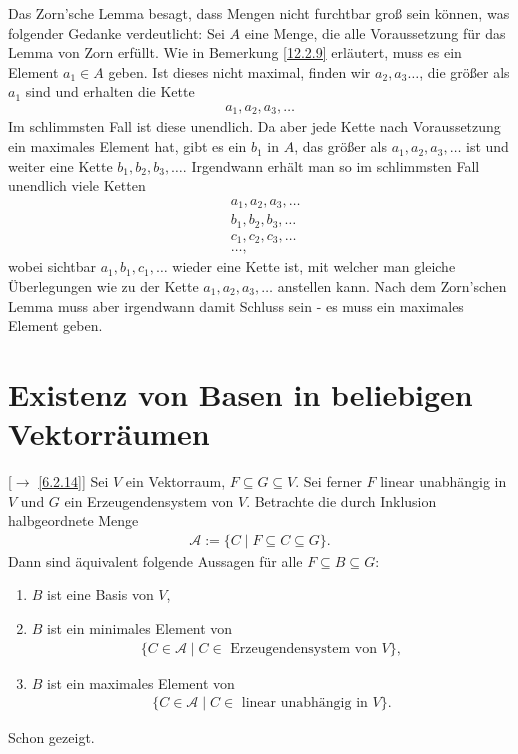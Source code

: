 \documentclass[../../main.tex]{subfiles}
\begin{document}
\begin{ans}
Das Zorn'sche Lemma besagt, dass Mengen nicht furchtbar groß sein können, was folgender Gedanke verdeutlicht: Sei $A$ eine Menge, die alle Voraussetzung für das Lemma von Zorn erfüllt. Wie in Bemerkung \ref{12.2.9} erläutert, muss es ein Element $a_1\in A$ geben. Ist dieses nicht maximal, finden wir $a_2,a_3\ldots $, die größer als $a_1$ sind und erhalten die Kette
\begin{align*}
a_1,a_2,a_3,\ldots 
\end{align*}
Im schlimmsten Fall ist diese unendlich. Da aber jede Kette nach Voraussetzung ein maximales Element hat, gibt es ein $b_1$ in $A$, das größer als $a_1,a_2,a_3,\ldots $ ist und weiter eine Kette $b_1,b_2,b_3,\ldots $. Irgendwann erhält man so im schlimmsten Fall unendlich viele Ketten
\begin{align*}
&a_1,a_2,a_3,\ldots \\
&b_1,b_2,b_3,\ldots \\
&c_1,c_2,c_3,\ldots \\
&\ldots ,
\end{align*}
wobei sichtbar $a_1,b_1,c_1,\ldots $ wieder eine Kette ist, mit welcher man gleiche Überlegungen wie zu der Kette $a_1,a_2,a_3,\ldots $ anstellen kann. Nach dem Zorn'schen Lemma muss aber irgendwann damit Schluss sein - es muss ein maximales Element geben.
\end{ans}

\section{Existenz von Basen in beliebigen Vektorräumen}
\begin{sat}\label{12.3.1}
[$\to$ \ref{6.2.14}] Sei $V$ ein Vektorraum, $F\subseteq G\subseteq V$. Sei ferner $F$ linear unabhängig in $V$ und $G$ ein Erzeugendensystem von $V$. Betrachte die durch Inklusion halbgeordnete Menge
\begin{align*}
\mathcal{A}:=\{C\mid F\subseteq C\subseteq G\}.
\end{align*}
Dann sind äquivalent folgende Aussagen für alle $F\subseteq B\subseteq G$:
\begin{enumerate}[\normalfont (a)]
\item $B$ ist eine Basis von $V$,
\item $B$ ist ein minimales Element von
\begin{align*}
\{C\in \mathcal{A}\mid C\in\text{ Erzeugendensystem von } V\},
\end{align*}
\item $B$ ist ein maximales Element von
\begin{align*}
\{C\in \mathcal{A}\mid C\in\text{ linear unabhängig in } V\}.
\end{align*}
\end{enumerate}
\end{sat}
\begin{cproof}
Schon gezeigt.
\end{cproof}
\end{document}

